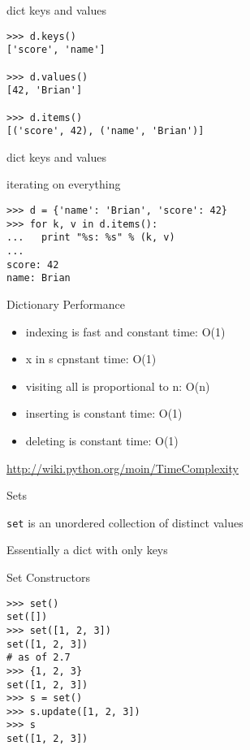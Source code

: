 \documentclass{beamer}
\begin{document}
\begin{frame}[fragile]{dict keys and values}

\vfill
\begin{verbatim}
>>> d.keys()
['score', 'name']

>>> d.values()
[42, 'Brian']

>>> d.items()
[('score', 42), ('name', 'Brian')]
\end{verbatim}
\vfill
\end{frame}

\begin{frame}[fragile]{dict keys and values}

{\Large iterating on everything}
\vfill
\begin{verbatim}
>>> d = {'name': 'Brian', 'score': 42}
>>> for k, v in d.items():
...   print "%s: %s" % (k, v)
...
score: 42
name: Brian
\end{verbatim}
\vfill
\end{frame}

\begin{frame}[fragile]{Dictionary Performance }

\begin{itemize}
  \item indexing is fast and constant time: O(1)
  \item x in s cpnstant time: O(1)
  \item visiting all is proportional to n: O(n)
  \item inserting is constant time: O(1)
  \item deleting is constant time: O(1)
\end{itemize}

\vfill
\url{ http://wiki.python.org/moin/TimeComplexity}

\end{frame} 



\begin{frame}[fragile]{ Sets }

\vfill
{\Large \verb|set| is an unordered collection of distinct values}

\vfill
{\Large Essentially a dict with only keys}

\vfill

\end{frame} 

\begin{frame}[fragile]{Set Constructors}

\vfill
\begin{verbatim}
>>> set()
set([])
>>> set([1, 2, 3])
set([1, 2, 3])
# as of 2.7
>>> {1, 2, 3}
set([1, 2, 3])
>>> s = set()
>>> s.update([1, 2, 3])
>>> s
set([1, 2, 3])
\end{verbatim}
\vfill

\end{frame}
\end{document}
